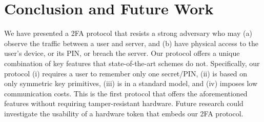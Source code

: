 

\section{Conclusion and Future Work}

We have presented a 2FA protocol that resists a strong adversary who may (a) observe the traffic between a user and server, and (b) have physical access to the user’s device, or its PIN, or breach the server. Our protocol offers a unique combination of key features that state-of-the-art schemes do not. Specifically,  our protocol (i) requires a user to remember only one secret/PIN, (ii) is based on only symmetric key primitives, (iii) is in a standard model, and (iv) imposes low communication costs. This is the first protocol that offers the aforementioned features without requiring tamper-resistant hardware. Future research could investigate the usability of a hardware token that embeds our 2FA protocol. 

